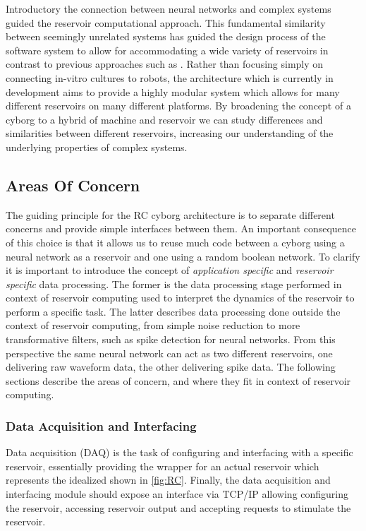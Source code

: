 Introductory the connection between neural networks and complex systems guided
the reservoir computational approach.
This fundamental similarity between seemingly unrelated systems has guided the
design process of the software system to allow for accommodating a wide variety
of reservoirs in contrast to previous approaches such as
\cite{li_application_2015}.
Rather than focusing simply on connecting in-vitro cultures to robots, the
architecture which is currently in development aims to provide a highly modular
system which allows for many different reservoirs on many different platforms.
By broadening the concept of a cyborg to a hybrid of machine and reservoir we
can study differences and similarities between different reservoirs, increasing
our understanding of the underlying properties of complex systems.
\subsection{Areas Of Concern}
The guiding principle for the RC cyborg architecture is to separate different
concerns and provide simple interfaces between them.
An important consequence of this choice is that it allows us to reuse much code
between a cyborg using a neural network as a reservoir and one using a random
boolean network.
To clarify it is important to introduce the concept of \textit{application
  specific} and \textit{reservoir specific} data processing.
The former is the data processing stage performed in context of reservoir
computing used to interpret the dynamics of the reservoir to perform a specific
task.
The latter describes data processing done outside the context of reservoir
computing, from simple noise reduction to more transformative filters, such as
spike detection for neural networks.
From this perspective the same neural network can act as two different
reservoirs, one delivering raw waveform data, the other delivering spike data.
The following sections describe the areas of concern, and where they fit in
context of reservoir computing.
\subsubsection{Data Acquisition and Interfacing}
Data acquisition (DAQ) is the task of configuring and interfacing with a specific
reservoir, essentially providing the wrapper for an actual reservoir which
represents the idealized shown in \ref{fig:RC}.
Finally, the data acquisition and interfacing module should expose an interface
via TCP/IP allowing configuring the reservoir, accessing reservoir output and
accepting requests to stimulate the reservoir.
